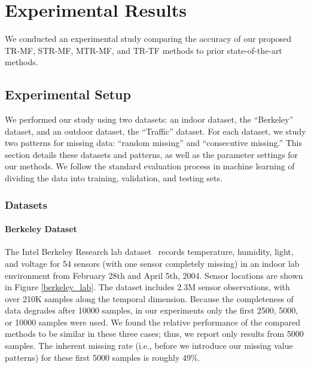 \section{Experimental Results}  \label{sec:exp}

We conducted an experimental study comparing the accuracy of our proposed TR-MF, STR-MF, MTR-MF, and TR-TF methods to
prior state-of-the-art methods.

\subsection{Experimental Setup}
We performed our study using two datasets: an indoor dataset, the ``Berkeley'' dataset, and an outdoor dataset, the ``Traffic''
dataset.  For each dataset, we study two patterns for missing data: ``random missing'' and ``consecutive missing.''  This section
details these datasets and patterns, as well as the parameter settings for our methods.
We follow the standard evaluation process in machine learning of dividing the data into training, validation, and testing sets.

\subsubsection{Datasets}
\vspace{-0.1in}

\paragraph*{Berkeley Dataset}

The Intel Berkeley Research lab dataset~\cite{berkeley2004lab} records temperature, humidity, light, and voltage for 54 sensors (with one sensor completely missing) in an indoor lab environment
from February 28th and April 5th, 2004.  Sensor locations are shown in Figure \ref{berkeley_lab}.
The dataset includes 2.3M sensor observations, with over 210K samples along the temporal dimension.
Because the completeness of data degrades after 10000 samples, in our experiments only the first 2500, 5000, or 10000 samples were used.
We found the relative performance of the compared methods to be similar in these three cases; thus, we report only results from 
5000 samples.  The inherent missing rate (i.e., before we introduce our missing value patterns) for these first 5000 samples is roughly 49\%.

